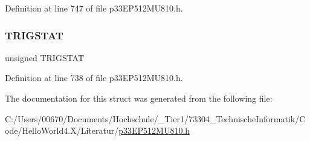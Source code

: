 Definition at line 747 of file p33\+E\+P512\+M\+U810.\+h.

\mbox{\label{structtag_i_c4_c_o_n2_b_i_t_s_ab379549de54ac93ad4aa73686c34cb7c}} 
\subsubsection{\texorpdfstring{T\+R\+I\+G\+S\+T\+AT}{TRIGSTAT}}
{\footnotesize\ttfamily unsigned T\+R\+I\+G\+S\+T\+AT}



Definition at line 738 of file p33\+E\+P512\+M\+U810.\+h.



The documentation for this struct was generated from the following file\+:\begin{DoxyCompactItemize}
\item 
C\+:/\+Users/00670/\+Documents/\+Hochschule/\+\_\+\+Tier1/73304\+\_\+\+Technische\+Informatik/\+Code/\+Hello\+World4.\+X/\+Literatur/\hyperlink{p33_e_p512_m_u810_8h}{p33\+E\+P512\+M\+U810.\+h}\end{DoxyCompactItemize}
